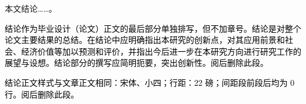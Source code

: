 \setlength{\baselineskip}{20pt}
\renewcommand{\thechapter}{结论}


本文结论……。\cite{李成智2004飞行之梦}

\textcolor{black}{结论作为毕业设计（论文）正文的最后部分单独排写，但不加章号。结论是对整个论文主要结果的总结。在结论中应明确指出本研究的创新点，对其应用前景和社会、经济价值等加以预测和评价，并指出今后进一步在本研究方向进行研究工作的展望与设想。结论部分的撰写应简明扼要，突出创新性。阅后删除此段。}

\textcolor{black}{结论正文样式与文章正文相同：宋体、小四；行距：22 磅；间距段前段后均为 0 行。阅后删除此段。}